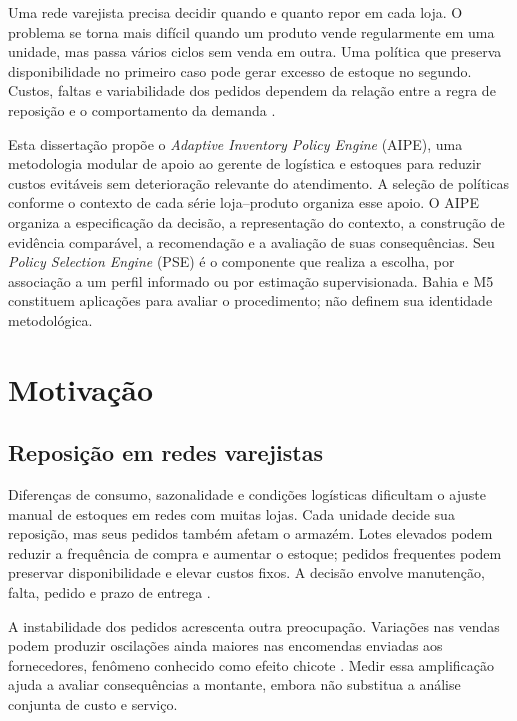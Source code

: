 
Uma rede varejista precisa decidir quando e quanto repor em cada loja. O problema se torna mais difícil quando um produto vende regularmente em uma unidade, mas passa vários ciclos sem venda em outra. Uma política que preserva disponibilidade no primeiro caso pode gerar excesso de estoque no segundo. Custos, faltas e variabilidade dos pedidos dependem da relação entre a regra de reposição e o comportamento da demanda \citep{Axsater2006InventoryControl,Syntetos2005Categorization}.

Esta dissertação propõe o \textit{Adaptive Inventory Policy Engine} (AIPE), uma metodologia modular de apoio ao gerente de logística e estoques para reduzir custos evitáveis sem deterioração relevante do atendimento. A seleção de políticas conforme o contexto de cada série loja--produto organiza esse apoio. O AIPE organiza a especificação da decisão, a representação do contexto, a construção de evidência comparável, a recomendação e a avaliação de suas consequências. Seu \textit{Policy Selection Engine} (PSE) é o componente que realiza a escolha, por associação a um perfil informado ou por estimação supervisionada. Bahia e M5 constituem aplicações para avaliar o procedimento; não definem sua identidade metodológica.

\section{Motivação}

\subsection{Reposição em redes varejistas}

Diferenças de consumo, sazonalidade e condições logísticas dificultam o ajuste manual de estoques em redes com muitas lojas. Cada unidade decide sua reposição, mas seus pedidos também afetam o armazém. Lotes elevados podem reduzir a frequência de compra e aumentar o estoque; pedidos frequentes podem preservar disponibilidade e elevar custos fixos. A decisão envolve manutenção, falta, pedido e prazo de entrega \citep{Axsater2006InventoryControl,Zipkin2000FoundationsInventory}.

A instabilidade dos pedidos acrescenta outra preocupação. Variações nas vendas podem produzir oscilações ainda maiores nas encomendas enviadas aos fornecedores, fenômeno conhecido como efeito chicote \citep{LeePadmanabhanWhang1997Bullwhip}. Medir essa amplificação ajuda a avaliar consequências a montante, embora não substitua a análise conjunta de custo e serviço.

